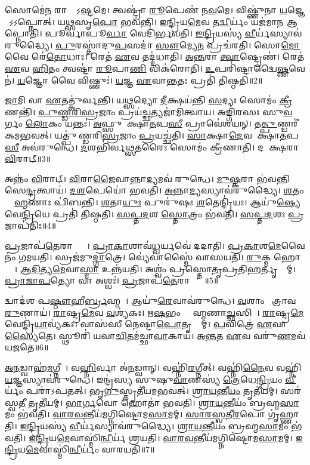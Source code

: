 𑌸𑍋𑌮𑍇॑\ul{𑌨} 𑌰𑌾𑌜𑍍𑌞𑌾᳚\-𑌽\ul{𑌷𑍍𑌟}𑌮𑍇।
𑌤𑍍𑌵𑌷𑍍𑌟𑍍𑌰𑌾॑ \ul{𑌰𑍂}𑌪𑍇𑌣॑ 𑌨\ul{𑌵}𑌮𑍇।
𑌵𑌿𑌷𑍍𑌣𑍁॑𑌨𑌾 \ul{𑌯}𑌜𑍍𑌞𑍇𑌨𑌾᳚𑌽𑌽𑌪𑍍𑌨𑍋𑌤𑍍।
𑌯\ul{𑌥𑍍𑌸}\ul{}𑌸𑍃\ul{𑌪𑍋} 𑌭𑌵॑𑌨𑍍𑌤𑌿।
\ul{𑌇}\ul{𑌨𑍍𑌦𑍍𑌰𑌿}𑌯\ul{𑌮𑍇}𑌵 𑌤\ul{𑌦𑍍𑌵𑍀}𑌰𑍍𑌯𑌂॑ 𑌯𑌜॑𑌮𑌾𑌨 𑌆𑌪𑍍𑌨𑍋𑌤𑌿।
𑌪𑍂𑌰𑍍𑌵𑌾॑𑌪𑍂\ul{𑌰𑍍𑌵𑌾} 𑌵𑍇𑌦𑌿॑𑌰𑍍𑌭𑌵𑌤𑌿।
\ul{𑌇}\ul{𑌨𑍍𑌦𑍍𑌰𑌿}𑌯𑌸𑍍𑌯॑ \ul{𑌵𑍀}𑌰𑍍𑌯॑𑌸𑍍𑌯𑌾𑌵॑𑌰𑍁𑌦𑍍𑌧𑍍𑌯𑍈।
\ul{𑌪𑍁}𑌰𑌸𑍍𑌤𑌾॑𑌦𑍁\ul{𑌪}𑌸𑌦𑌾॑ \ul{𑌸𑍗}𑌮𑍍𑌯𑍇\ul{𑌨} 𑌪𑍍𑌰𑌚॑𑌰𑌤𑌿।
𑌸𑍋\ul{𑌮𑍋} 𑌵𑍈 𑌰𑍇॑\ul{𑌤𑍋}𑌧𑌾𑌃।
𑌰𑍇𑌤॑ \ul{𑌏}𑌵 𑌤𑌦𑍍𑌦॑𑌧𑌾𑌤𑌿।
\ul{𑌅}\ul{𑌨𑍍𑌤}𑌰𑌾 \ul{𑌤𑍍𑌵𑌾}𑌷𑍍𑌟𑍍𑌰𑍇𑌣॑।
𑌰𑍇𑌤॑ \ul{𑌏}𑌵 \ul{𑌹𑌿}𑌤𑌂 𑌤𑍍𑌵𑌷𑍍𑌟𑌾॑ \ul{𑌰𑍂}𑌪𑌾\ul{𑌣𑌿} 𑌵𑌿𑌕॑𑌰𑍋𑌤𑌿।
\ul{𑌉}𑌪𑌰𑌿॑𑌷𑍍𑌟𑌾𑌦𑍍𑌵𑍈\ul{𑌷𑍍𑌣}𑌵𑍇𑌨॑।
\ul{𑌯}𑌜𑍍𑌞𑍋 𑌵𑍈 𑌵𑌿𑌷𑍍𑌣𑍁𑌃॑।
\ul{𑌯}𑌜𑍍𑌞 \ul{𑌏}𑌵𑌾\ul{𑌨𑍍𑌤}𑌤𑌃 𑌪𑍍𑌰𑌤𑌿॑ 𑌤𑌿𑌷𑍍𑌠𑌤𑌿॥2॥\anuvakamend[\ul{𑌸}\ul{𑌪𑍍𑌤}𑌮𑍇 𑌦॑𑌧𑌾\ul{𑌤𑌿} 𑌪𑌞𑍍𑌚॑ 𑌚]

\ul{𑌜𑌾}𑌮𑌿 𑌵𑌾 \ul{𑌏}𑌤𑌤𑍍𑌕𑍁॑𑌰𑍍𑌵𑌨𑍍𑌤𑌿।
𑌯\ul{𑌥𑍍𑌸}𑌦𑍍𑌯𑍋 \ul{𑌦𑍀}𑌕𑍍𑌷𑌯॑𑌨𑍍𑌤𑌿 \ul{𑌸}𑌦𑍍𑌯𑌃 𑌸𑍋𑌮𑌂॑ \ul{𑌕𑍍𑌰𑍀}𑌣𑌨𑍍𑌤𑌿॑।
\ul{𑌪𑍁}\ul{𑌣𑍍𑌡}\ul{𑌰𑌿}\ul{𑌸𑍍𑌰}𑌜𑌾𑌂 𑌪𑍍𑌰𑌯॑\ul{𑌚𑍍𑌛}𑌤𑍍𑌯𑌜𑌾॑𑌮𑌿𑌤𑍍𑌵𑌾𑌯।
𑌅𑌙𑍍𑌗𑌿॑𑌰𑌸𑌃 𑌸𑍁\ul{𑌵}𑌰𑍍𑌗𑌂 \ul{𑌲𑍋}𑌕𑌂 𑌯𑌨𑍍𑌤𑌃॑।
\ul{𑌅}𑌫𑍍𑌸𑍁 𑌦𑍀᳚𑌕𑍍𑌷𑌾\ul{𑌤}𑌪\ul{𑌸𑍀} 𑌪𑍍𑌰𑌾𑌵𑍇॑𑌶𑌯𑌨𑍍।
𑌤\ul{𑌤𑍍𑌪𑍁}𑌣𑍍𑌡𑌰𑍀॑𑌕𑌮𑌭𑌵𑌤𑍍।
𑌯𑌤𑍍𑌪𑍁॑𑌣𑍍𑌡𑌰𑌿\ul{𑌸𑍍𑌰}𑌜𑌾𑌂 \ul{𑌪𑍍𑌰}𑌯𑌚𑍍𑌛॑𑌤𑌿।
\ul{𑌸𑌾}𑌕𑍍𑌷𑌾\ul{𑌦𑍇}𑌵 𑌦𑍀᳚𑌕𑍍𑌷𑌾\ul{𑌤}𑌪\ul{𑌸𑍀} 𑌅𑌵॑𑌰𑍁𑌨𑍍𑌧𑍇।
\ul{𑌦}𑌶𑌭𑌿॑𑌰𑍍𑌵𑌥𑍍𑌸\ul{𑌤}𑌰𑍈𑌃 𑌸𑍋𑌮𑌂॑ 𑌕𑍍𑌰𑍀𑌣𑌾𑌤𑌿।
𑌦𑌶𑌾᳚𑌕𑍍𑌷𑌰𑌾 \ul{𑌵𑌿}𑌰𑌾𑌟𑍍॥3॥

𑌅𑌨𑍍𑌨𑌂॑ \ul{𑌵𑌿}𑌰𑌾𑌟𑍍।
\ul{𑌵𑌿}𑌰𑌾\ul{𑌜𑍈}𑌵𑌾𑌨𑍍𑌨𑌾\ul{𑌦𑍍𑌯}𑌮𑌵॑ 𑌰𑍁𑌨𑍍𑌧𑍇।
\ul{𑌮𑍁}\ul{𑌷𑍍𑌕}𑌰𑌾 𑌭॑𑌵𑌨𑍍𑌤𑌿 𑌸𑍇\ul{𑌨𑍍𑌦𑍍𑌰}𑌤𑍍𑌵𑌾𑌯॑।
\ul{𑌦}\ul{𑌶}𑌪𑍇𑌯𑍋॑ 𑌭𑌵𑌤𑌿।
\ul{𑌅}𑌨𑍍𑌨𑌾\ul{𑌦𑍍𑌯}𑌸𑍍𑌯𑌾𑌵॑𑌰𑍁𑌦𑍍𑌧𑍍𑌯𑍈।
\ul{𑌶}𑌤𑌂 𑌬𑍍𑌰𑌾᳚\ul{𑌹𑍍𑌮}𑌣𑌾𑌃 𑌪𑌿॑𑌬𑌨𑍍𑌤𑌿।
\ul{𑌶}𑌤𑌾\ul{𑌯𑍁𑌃} 𑌪𑍁𑌰𑍁॑𑌷𑌃 \ul{𑌶}𑌤𑍇𑌨𑍍𑌦𑍍𑌰𑌿॑𑌯𑌃।
𑌆𑌯𑍁॑\ul{𑌷𑍍𑌯𑍇}𑌵𑍇\ul{𑌨𑍍𑌦𑍍𑌰𑌿}𑌯𑍇 𑌪𑍍𑌰𑌤𑌿॑ 𑌤𑌿𑌷𑍍𑌠𑌤𑌿।
\ul{𑌸}\ul{𑌪𑍍𑌤}\ul{𑌦}𑌶 \ul{𑌸𑍍𑌤𑍋}𑌤𑍍𑌰𑌂 𑌭॑𑌵𑌤𑌿।
\ul{𑌸}\ul{𑌪𑍍𑌤}\ul{𑌦}𑌶𑌃 \ul{𑌪𑍍𑌰}𑌜𑌾𑌪॑𑌤𑌿𑌃॥4॥

\ul{𑌪𑍍𑌰}𑌜𑌾𑌪॑\ul{𑌤𑍇}𑌰𑌾𑌪𑍍𑌤𑍍𑌯𑍈᳚।
\ul{𑌪𑍍𑌰𑌾}\ul{𑌕𑌾}𑌶𑌾𑌵॑\ul{𑌧𑍍𑌵}𑌰𑍍𑌯𑌵𑍇॑ 𑌦𑌦𑌾𑌤𑌿।
\ul{𑌪𑍍𑌰}\ul{𑌕𑌾}𑌶\ul{𑌮𑍇}𑌵𑍈𑌨𑌂॑ 𑌗𑌮𑌯𑌤𑌿।
𑌸𑍍𑌰𑌜॑𑌮𑍁\ul{𑌦𑍍𑌗𑌾}𑌤𑍍𑌰𑍇।
𑌵𑍍𑌯𑍇॑𑌵𑌾𑌸𑍍𑌮𑍈॑ 𑌵𑌾𑌸𑌯𑌤𑌿।
\ul{𑌰𑍁}𑌕𑍍𑌮 𑌹𑍋𑌤𑍍𑌰𑍇᳚।
\ul{𑌆}\ul{𑌦𑌿}𑌤𑍍𑌯\ul{𑌮𑍇}𑌵𑌾\ul{𑌸𑍍𑌮𑌾} 𑌉𑌨𑍍𑌨॑𑌯𑌤𑌿।
𑌅𑌶𑍍𑌵𑌂॑ 𑌪𑍍𑌰𑌸𑍍𑌤𑍋𑌤𑍃𑌪𑍍𑌰𑌤𑌿\ul{𑌹}𑌰𑍍𑌤𑍃𑌭𑍍𑌯𑌾᳚𑌮𑍍।
\ul{𑌪𑍍𑌰𑌾}\ul{𑌜𑌾}\ul{𑌪}𑌤𑍍𑌯𑍋 𑌵𑌾 𑌅𑌶𑍍𑌵𑌃॑।
\ul{𑌪𑍍𑌰}𑌜𑌾𑌪॑\ul{𑌤𑍇}𑌰𑌾𑌪𑍍𑌤𑍍𑌯𑍈᳚॥5॥

𑌦𑍍𑌵𑌾𑌦॑𑌶 𑌪\ul{𑌷𑍍𑌠𑍗}𑌹𑍀\ul{𑌰𑍍𑌬𑍍𑌰}𑌹𑍍𑌮𑌣𑍇᳚।
𑌆𑌯𑍁॑\ul{𑌰𑍇}𑌵𑌾𑌵॑𑌰𑍁𑌨𑍍𑌧𑍇।
\ul{𑌵}𑌶𑌾𑌂 𑌮𑍈᳚𑌤𑍍𑌰𑌾𑌵\ul{𑌰𑍁}𑌣𑌾𑌯॑।
\ul{𑌰𑌾}𑌷𑍍𑌟𑍍𑌰\ul{𑌮𑍇}𑌵 \ul{𑌵}𑌶𑍍𑌯॑𑌕𑌃।
\ul{𑌋}\ul{𑌷}𑌭𑌂 𑌬𑍍𑌰𑌾᳚𑌹𑍍𑌮𑌣𑌾\ul{𑌚𑍍𑌛}\ul{}𑌸𑌿𑌨𑍇᳚।
\ul{𑌰𑌾}𑌷𑍍𑌟𑍍𑌰\ul{𑌮𑍇}𑌵𑍇𑌨𑍍𑌦𑍍𑌰𑌿॑\ul{𑌯𑌾}\-𑌵𑍍𑌯॑𑌕𑌃।
𑌵𑌾𑌸॑𑌸𑍀 𑌨𑍇𑌷𑍍𑌟𑌾\ul{𑌪𑍋}𑌤𑍃𑌭𑍍𑌯𑌾᳚𑌮𑍍।
\ul{𑌪}𑌵𑌿𑌤𑍍𑌰𑍇॑ \ul{𑌏}𑌵𑌾\ul{𑌸𑍍𑌯𑍈}𑌤𑍇।
𑌸𑍍𑌥𑍂𑌰𑌿॑ 𑌯𑌵𑌾\ul{𑌚𑌿}𑌤𑌮॑𑌚𑍍𑌛𑌾\ul{𑌵𑌾}𑌕𑌾𑌯॑।
\ul{𑌅}\ul{𑌨𑍍𑌤}𑌤 \ul{𑌏}𑌵 𑌵𑌰𑍁॑\ul{𑌣}𑌮𑌵॑ 𑌯𑌜𑌤𑍇॥6॥

\ul{𑌅}\ul{𑌨}𑌡𑍍𑌵𑌾𑌹॑\ul{𑌮}𑌗𑍍𑌨𑍀𑌧𑍇᳚।
𑌵\ul{𑌹𑍍𑌨𑌿}𑌰𑍍𑌵𑌾 𑌅॑\ul{𑌨}𑌡𑍍𑌵𑌾𑌨𑍍।
𑌵𑌹𑍍𑌨𑌿॑\ul{𑌰}𑌗𑍍𑌨𑍀𑌤𑍍।
𑌵𑌹𑍍𑌨𑌿॑\ul{𑌨𑍈}𑌵 𑌵𑌹𑍍𑌨𑌿॑ \ul{𑌯}𑌜𑍍𑌞𑌸𑍍𑌯𑌾𑌵॑𑌰𑍁𑌨𑍍𑌧𑍇।
𑌇𑌨𑍍𑌦𑍍𑌰॑𑌸𑍍𑌯 𑌸𑍁𑌷𑍁\ul{𑌵𑌾}𑌣𑌸𑍍𑌯॑ \ul{𑌤𑍍𑌰𑍇}𑌧𑍇\ul{𑌨𑍍𑌦𑍍𑌰𑌿}𑌯𑌂 \ul{𑌵𑍀}𑌰𑍍𑌯𑌂॑ 𑌪𑌰𑌾॑\-𑌽𑌪𑌤𑌤𑍍।
𑌭𑍃\ul{𑌗𑍁}𑌸𑍍𑌤𑍃𑌤𑍀॑𑌯𑌮𑌭𑌵𑌤𑍍।
\ul{𑌶𑍍𑌰𑌾}\ul{𑌯}𑌨𑍍𑌤𑍀\ul{𑌯𑌂} 𑌤𑍃𑌤𑍀॑𑌯𑌮𑍍।
𑌸𑌰॑𑌸𑍍𑌵\ul{𑌤𑍀} 𑌤𑍃𑌤𑍀॑𑌯𑌮𑍍।
\ul{𑌭𑌾}\ul{𑌰𑍍𑌗}𑌵𑍋 𑌹𑍋𑌤𑌾॑ 𑌭𑌵𑌤𑌿।
\ul{𑌶𑍍𑌰𑌾}\ul{𑌯}𑌨𑍍𑌤𑍀𑌯𑌂॑ 𑌬𑍍𑌰𑌹𑍍𑌮\ul{𑌸𑌾}𑌮𑌂 𑌭॑𑌵𑌤𑌿।
\ul{𑌵𑌾}\ul{𑌰}\ul{𑌵}𑌨𑍍𑌤𑍀𑌯॑𑌮𑌗𑍍𑌨𑌿𑌷𑍍𑌟𑍋𑌮\ul{𑌸𑌾}𑌮𑌮𑍍।
\ul{𑌸𑌾}\ul{𑌰}\ul{𑌸𑍍𑌵}𑌤𑍀\ul{𑌰}𑌪𑍋 𑌗𑍃॑𑌹𑍍𑌣𑌾𑌤𑌿।
\ul{𑌇}\ul{𑌨𑍍𑌦𑍍𑌰𑌿}𑌯𑌸𑍍𑌯॑ \ul{𑌵𑍀}𑌰𑍍𑌯॑𑌸𑍍𑌯𑌾𑌵॑𑌰𑍁𑌦𑍍𑌧𑍍𑌯𑍈।
\ul{𑌶𑍍𑌰𑌾}\ul{𑌯}𑌨𑍍𑌤𑍀𑌯𑌂॑ 𑌬𑍍𑌰𑌹𑍍𑌮\ul{𑌸𑌾}𑌮𑌂 𑌭॑𑌵𑌤𑌿।
\ul{𑌇}\ul{𑌨𑍍𑌦𑍍𑌰𑌿}𑌯\ul{𑌮𑍇}𑌵𑌾𑌸𑍍𑌮𑌿॑\ul{𑌨𑍍𑌵𑍀}𑌰𑍍𑌯॑ 𑌶𑍍𑌰𑌯𑌤𑌿।
\ul{𑌵𑌾}\ul{𑌰}\ul{𑌵}𑌨𑍍𑌤𑍀𑌯॑𑌮𑌗𑍍𑌨𑌿𑌷𑍍𑌟𑍋𑌮\ul{𑌸𑌾}𑌮𑌮𑍍।
\ul{𑌇}\ul{𑌨𑍍𑌦𑍍𑌰𑌿}𑌯\ul{𑌮𑍇}𑌵𑌾𑌸𑍍𑌮𑌿॑\ul{𑌨𑍍𑌵𑍀}𑌰𑍍𑌯𑌂॑ 𑌵𑌾𑌰𑌯𑌤𑌿॥7॥\anuvakamend[\ul{𑌵𑌿}𑌰𑌾\ul{𑌟𑍍𑌪𑍍𑌰}𑌜𑌾𑌪॑\ul{𑌤𑌿}𑌰𑌶𑍍𑌵𑌃॑ \ul{𑌪𑍍𑌰}𑌜𑌾𑌪॑\ul{𑌤𑍇}𑌰𑌾𑌪𑍍𑌤𑍍𑌯𑍈॑ 𑌯𑌜𑌤𑍇 𑌬𑍍𑌰𑌹𑍍𑌮\ul{𑌸𑌾}𑌮𑌂 𑌭॑𑌵𑌤𑌿 \ul{𑌸}𑌪𑍍𑌤 𑌚॑]

